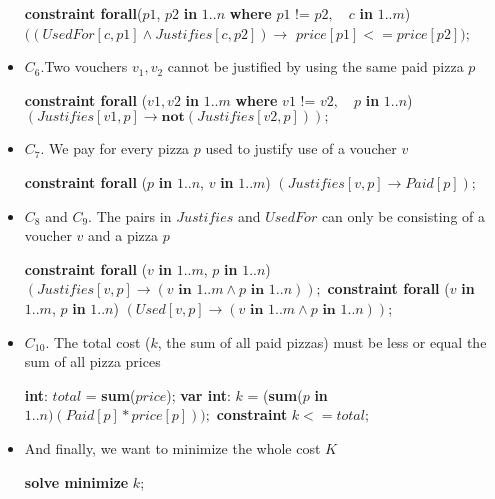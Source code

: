 \documentclass[conference]{IEEEtran}
\newcommand\tab[1][0.3cm]{\hspace*{#1}}
\begin{document}
\begin{itemize}
\begin{algorithmic}
\State \textbf{constraint forall}($p1$, $p2$ \textbf{in} $1..n$ \textbf{where} $p1 \text{ != } p2,$
\State \tab\tab\tab\tab\tab\tab\tab\tab $\text{ } c$ \textbf{in} $1..m$)
\State \tab\tab $((UsedFor[c, p1] \land Justifies[c, p2]) \rightarrow$
\State \tab\tab\tab\tab $price[p1] <= price[p2]);$
\\
\end{algorithmic}
\item $C_6$.Two vouchers $v_1, v_2$ cannot be justified by using the same paid pizza $p$
\begin{algorithmic}
\State \textbf{constraint forall} ($v1, v2$ \textbf{in} $1..m$ \textbf{where} $v1$ != $v2,$
\State \tab\tab\tab\tab\tab\tab\tab\tab $\text{ } p$ \textbf{in} $1..n$)
\State \tab\tab $(Justifies[v1, p] \rightarrow \textbf{not} (Justifies[v2, p]));$
\\
\end{algorithmic}
\item $C_7$. We pay for every pizza $p$ used to justify use of a voucher $v$
\begin{algorithmic}
\State \textbf{constraint forall} ($p$ \textbf{in} $1..n$, $v$ \textbf{in} $1..m$)
\State \tab\tab $(Justifies[v, p] \rightarrow Paid[p]);$
\\
\end{algorithmic}
\item $C_8$ and $C_9$. The pairs in $Justifies$ and $UsedFor$ can only be consisting of a voucher $v$ and a pizza $p$
\begin{algorithmic}
\State \textbf{constraint forall} ($v$ \textbf{in} $1..m$, $p$ \textbf{in} $1..n$)
\State \tab\tab $(Justifies[v, p] \rightarrow (v \textbf{ in } 1..m \land p \textbf{ in } 1..n));$
\State \textbf{constraint forall} ($v$ \textbf{in} $1..m$, $p$ \textbf{in} $1..n$)
\State \tab\tab $(Used[v, p] \rightarrow (v \textbf{ in } 1..m \land p \textbf{ in } 1..n));$
\\
\end{algorithmic}
\item $C_{10}$. The total cost ($k$, the sum of all paid pizzas) must be less or equal the sum of all pizza prices
\begin{algorithmic}
\State \textbf{int}: $total$ = \textbf{sum}($price$);
\State \textbf{var int}: $k$ = (\textbf{sum}($p$ \textbf{in} $1..n)(Paid[p] * price[p]));$
\State \textbf{constraint} $k <= total;$
\\
\end{algorithmic}
\item And finally, we want to minimize the whole cost $K$
\begin{algorithmic}
\State \textbf{solve minimize} $k$;
\\
\end{algorithmic}
\end{itemize}
\end{document}
